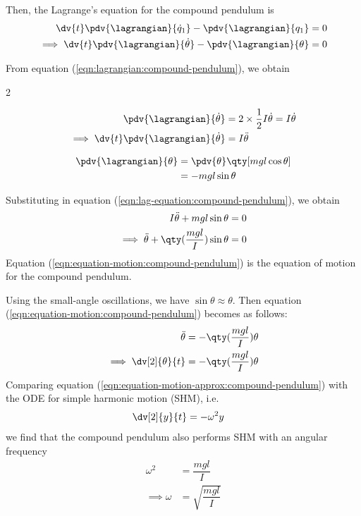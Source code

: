 \begin{enumerate}
	Then, the Lagrange's equation for the compound pendulum is
	\begin{align}
		\dv{t}\pdv{\lagrangian}{\dot{q}_1}-\pdv{\lagrangian}{q_1}&=0 \nonumber\\
		\implies\dv{t}\pdv{\lagrangian}{\dot{\theta}}-\pdv{\lagrangian}{\theta}&=0 \label{eqn:lag-equation:compound-pendulum}
	\end{align}
	
	\newpage
	From equation (\ref{eqn:lagrangian:compound-pendulum}), we obtain\vspace{-5ex}
	\begin{multicols}{2}
		\setlength{\columnseprule}{0.4pt}
		
		\begin{align*}
			\pdv{\lagrangian}{\dot{\theta}}&=2\times\dfrac{1}{2}I\dot{\theta}=I\dot{\theta} \\
			\implies\dv{t}\pdv{\lagrangian}{\dot{\theta}}&=I\ddot{\theta}
		\end{align*}
		
		\columnbreak
		\begin{align*}
			\pdv{\lagrangian}{\theta}&=\pdv{\theta}\qty[mgl\cos{\theta}] \\
			&=-mgl\sin{\theta}
		\end{align*}
		
	\end{multicols}
	
	Substituting in equation (\ref{eqn:lag-equation:compound-pendulum}), we obtain
	\begin{align}
		I\ddot{\theta}+mgl\sin{\theta}&=0 \nonumber\\
		\implies\ddot{\theta}+\qty(\dfrac{mgl}{I})\sin{\theta}&=0 \label{eqn:equation-motion:compound-pendulum} 
	\end{align}
	Equation (\ref{eqn:equation-motion:compound-pendulum}) is the equation of motion for the compound pendulum.
	
	Using the small-angle oscillations, we have $\sin{\theta}\approx\theta$. Then equation (\ref{eqn:equation-motion:compound-pendulum}) becomes as follows:
	\begin{align}
		\ddot{\theta}&=-\qty(\dfrac{mgl}{I})\theta \nonumber\\
		\implies\dv[2]{\theta}{t}&=-\qty(\dfrac{mgl}{I})\theta \label{eqn:equation-motion-approx:compound-pendulum}
	\end{align}
	Comparing equation (\ref{eqn:equation-motion-approx:compound-pendulum}) with the ODE for simple harmonic motion (SHM), i.e.
	\begin{align*}
		\dv[2]{y}{t}&=-\omega^2y
	\end{align*}
	we find that the compound pendulum also performs SHM with an angular frequency
	\begin{align*}
		\omega^2&=\dfrac{mgl}{I} \\
		\implies\omega&=\sqrt{\dfrac{mgl}{I}}
	\end{align*}
	

\end{enumerate}
